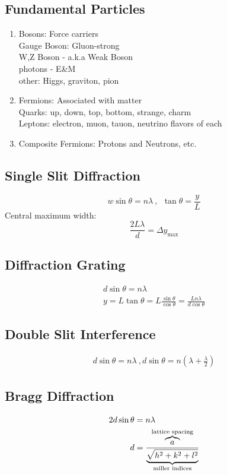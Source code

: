 \documentclass[10pt,a4paper]{article}
\begin{document}
\subsection{Fundamental Particles}
\begin{enumerate}
    \item Bosons: Force carriers\\
     Gauge Boson: Gluon-strong\\
     W,Z Boson - a.k.a Weak Boson\\
     photons - E\&M\\
     other: Higgs, graviton, pion
    \item Fermions: Associated with matter\\
    Quarks: up, down, top, bottom, strange, charm\\
    Leptons: electron, muon, tauon, neutrino flavors of each
    \item Composite Fermions: Protons and Neutrons, etc.
\end{enumerate}

\subsection{Single Slit Diffraction}
\begin{equation}
 w\sin \theta = n\lambda~,~~\tan\theta = \frac{y}{L} 
\end{equation}
Central maximum width:
\begin{equation}
 \frac{2L\lambda}{d} = \Delta y_{\textrm{max}}
\end{equation}

\subsection{Diffraction Grating}
\begin{align}
 d\sin\theta = n \lambda\\
 y = L \tan \theta = L\frac{\sin\theta}{\cos\theta} = \frac{Ln\lambda}{d\cos\theta}
\end{align}

\subsection{Double Slit Interference}
\begin{align}
 d\sin\theta = n\lambda~, d\sin\theta = n \left( \lambda + \frac{\lambda}{2} \right) 
\end{align}

\subsection{Bragg Diffraction}
\begin{align}
 2d\sin\theta &= n\lambda\\
 d &= \frac{\overbrace{a}^{\mathclap{\textrm{lattice spacing}}}}{\underbrace{\sqrt{h^2 + k^2 + l^2}}_{ \mathclap{\textrm{miller indices} } } }
\end{align}
\end{document}
